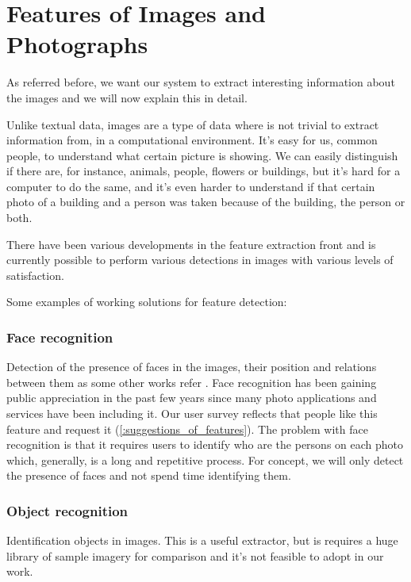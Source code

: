 



\section{Features of Images and Photographs}
\label{reqs:features}

As referred before, we want our system to extract interesting information about the images and we will now explain this in detail.


Unlike textual data, images are a type of data where is not trivial to extract information from, in a computational environment. It's easy for us, common people, to understand what certain picture is showing. We can easily distinguish if there are, for instance, animals, people, flowers or buildings, but it's hard for a computer to do the same, and it's even harder to understand if that certain photo of a building and a person was taken because of the building, the person or both.

There have been various developments in the feature extraction front \cite{Liu:2007p3740,Datta:2005p3749,Rui:1999p949} and is currently possible to perform various detections in images with various levels of satisfaction.

Some examples of working solutions for feature detection:

\subsubsection{Face recognition}
Detection of the presence of faces in the images, their position and relations between them as some other works refer \cite{Vasconcelos:2005in,Chen:2003p3699,Tamura:2002p859,Hsu:2002p3675}. Face recognition has been gaining public appreciation in the past few years since many photo applications and services have been including it. Our user survey reflects that people like this feature and request it (\ref{:suggestions_of_features}). The problem with face recognition is that it requires users to identify who are the persons on each photo which, generally, is a long and repetitive process. For concept, we will only detect the presence of faces and not spend time identifying them.

\subsubsection{Object recognition}
Identification objects in images. This is a useful extractor, but is requires a huge library of sample imagery for comparison \cite{Torralba:2008p527} and it's not feasible to adopt in our work.
	
